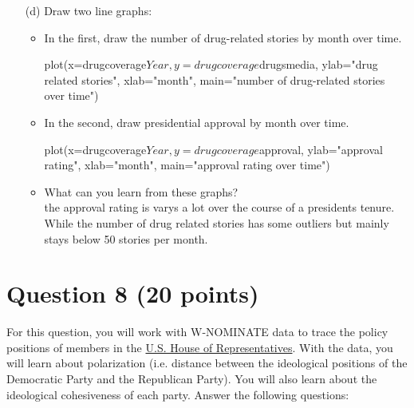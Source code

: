\documentclass[12pt,letterpaper]{article}
\begin{document}
\begin{itemize}
\item[(d)]  Draw two line graphs:
\begin{itemize}
\item In the first, draw the number of drug-related stories by month over time.

plot(x=drugcoverage$Year, y=drugcoverage$drugsmedia, ylab="drug related stories", xlab="month", main="number of drug-related stories over time")

\item In the second, draw presidential approval by month over time.

plot(x=drugcoverage$Year, y=drugcoverage$approval, ylab="approval rating", xlab="month", main="approval rating over time")

\item What can you learn from these graphs? \\
the approval rating is varys a lot over the course of a presidents tenure. While the number of drug related stories has some outliers but mainly stays below 50 stories per month.

\end{itemize}



\end{itemize}

\section*{Question 8 (20 points)}
For this question, you will work with W-NOMINATE data to trace the policy positions of members in the \href{https://drive.google.com/open?id=1kVn-Asz8KXPQhiLSQGEabdVJh9_8_wjf}{U.S. House of Representatives}. With the data, you will learn about polarization (i.e. distance between the ideological positions of the Democratic Party and the Republican Party). You will also learn about the ideological cohesiveness of each party. Answer the following questions:\\
\end{document}
